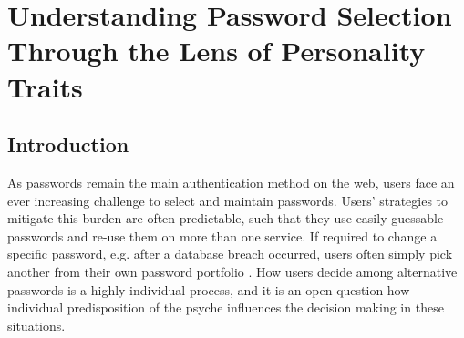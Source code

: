 \chapter[Password Selection and Personality Traits]{Understanding Password Selection Through the Lens of Personality Traits}\label{chap:pws_and_personality}

\section{Introduction}


As passwords remain the main authentication method on the web, users face an ever increasing challenge to select and maintain passwords. Users' strategies to mitigate this burden are often predictable, such that they use easily guessable passwords and re-use them on more than one service. If required to change a specific password, e.g. after a database breach occurred, users often simply pick another from their own password portfolio \cite{Bonneau2015ImperfectAuthentication, Florencio2014PasswordPortfoliosFiniteUser, Stobert2014PasswordLifeCycle}. How users decide among alternative passwords is a highly individual process, and it is an open question how individual predisposition of the psyche influences the decision making in these situations.


